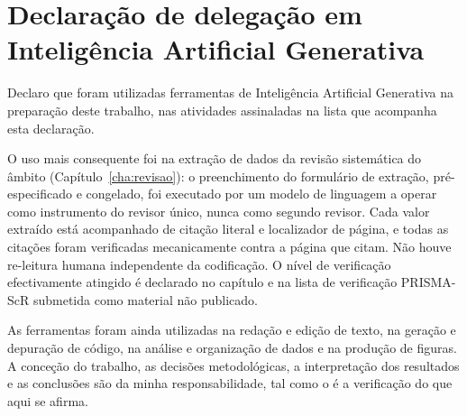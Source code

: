 
\chapter{Declaração de delegação em Inteligência Artificial Generativa}

Declaro que foram utilizadas ferramentas de Inteligência Artificial
Generativa na preparação deste trabalho, nas atividades assinaladas na
lista que acompanha esta declaração.

O uso mais consequente foi na extração de dados da revisão sistemática
do âmbito (Capítulo~\ref{cha:revisao}): o preenchimento do formulário de
extração, pré-especificado e congelado, foi executado por um modelo de
linguagem a operar como instrumento do revisor único, nunca como segundo
revisor. Cada valor extraído está acompanhado de citação literal e
localizador de página, e todas as citações foram verificadas
mecanicamente contra a página que citam. Não houve re-leitura humana
independente da codificação. O nível de verificação efectivamente
atingido é declarado no capítulo e na lista de verificação PRISMA-ScR
submetida como material não publicado.

As ferramentas foram ainda utilizadas na redação e edição de texto, na
geração e depuração de código, na análise e organização de dados e na
produção de figuras. A conceção do trabalho, as decisões metodológicas,
a interpretação dos resultados e as conclusões são da minha
responsabilidade, tal como o é a verificação do que aqui se afirma.
